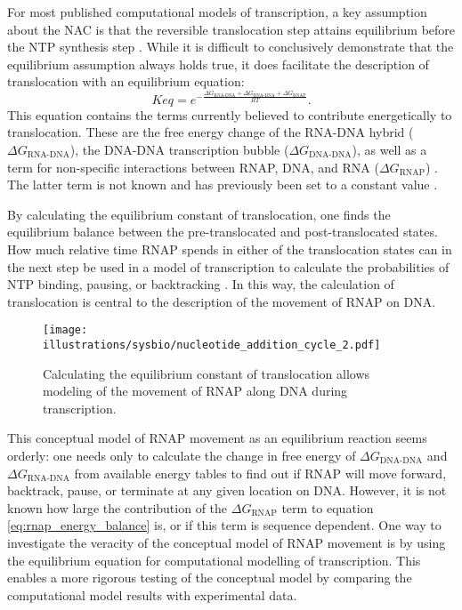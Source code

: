 For most published computational models of transcription, a key assumption
about the NAC is that the reversible translocation step attains equilibrium
before the NTP synthesis step \cite{greive_thinking_2005,
bai_mechanochemical_2007, guajardo_model_1997}. While it is difficult to
conclusively demonstrate that the equilibrium assumption always holds true, it
does facilitate the description of translocation with an equilibrium equation:
\begin{equation}
	Keq = e^{-\frac{\Delta G_{\text{RNA-DNA}} + \Delta
	G_{\text{DNA-DNA}} + \Delta G_{\text{RNAP}}}{RT}}.
	\label{eq:rnap_energy_balance}
\end{equation}
This equation contains the terms currently believed to contribute energetically
to translocation. These are the free energy change of the RNA-DNA hybrid
($\Delta G_{\text{RNA-DNA}}$), the DNA-DNA transcription bubble ($\Delta
G_{\text{DNA-DNA}}$), as well as a term for non-specific interactions between
RNAP, DNA, and RNA ($\Delta G_{\text{RNAP}}$) \cite{greive_thinking_2005}. The
latter term is not known and has previously been set to a
constant value \cite{tadigotla_thermodynamic_2006,
bai_sequence-dependent_2004}.

By calculating the equilibrium constant of translocation, one finds the
equilibrium balance between the pre-translocated and post-translocated states.
How much relative time RNAP spends in either of the translocation states can in
the next step be used in a model of transcription to calculate the
probabilities of NTP binding, pausing, or backtracking
\cite{greive_thinking_2005, bai_mechanochemical_2007, guajardo_model_1997}. In
this way, the calculation of translocation is central to the description of the
movement of RNAP on DNA.

\begin{figure}[htb]
	\begin{center}
		\texttt{[image: illustrations/sysbio/nucleotide\_addition\_cycle\_2.pdf]}
	\end{center}
	\caption{Calculating the equilibrium constant of translocation allows
	modeling of the movement of RNAP along DNA during transcription.}
	\label{fig:nac_2}
\end{figure}

This conceptual model of RNAP movement as an equilibrium reaction seems
orderly: one needs only to calculate the change in free energy of $\Delta
G_{\text{DNA-DNA}}$ and $\Delta G_{\text{RNA-DNA}}$ from available energy
tables \cite{wu_temperature_2002, santalucia_thermodynamics_2004} to find out
if RNAP will move forward, backtrack, pause, or terminate at any given location
on DNA. However, it is not known how large the contribution of the $\Delta
G_{\text{RNAP}}$ term to equation \eqref{eq:rnap_energy_balance} is, or if
this term is sequence dependent. One way to investigate the veracity of
the conceptual model of RNAP movement is by using the equilibrium equation for
computational modelling of transcription. This enables a more rigorous testing
of the conceptual model by comparing the computational model results with
experimental data.

